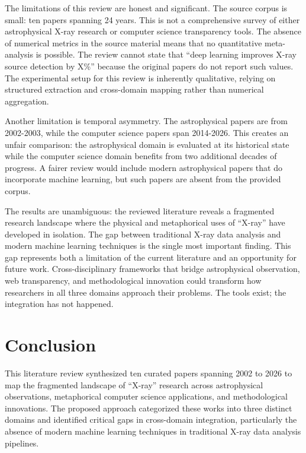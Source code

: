 \documentclass[conference]{IEEEtran}
\begin{document}
The limitations of this review are honest and significant. The source corpus is small: ten papers spanning 24 years. This is not a comprehensive survey of either astrophysical X-ray research or computer science transparency tools. The absence of numerical metrics in the source material means that no quantitative meta-analysis is possible. The review cannot state that ``deep learning improves X-ray source detection by X\%'' because the original papers do not report such values. The experimental setup for this review is inherently qualitative, relying on structured extraction and cross-domain mapping rather than numerical aggregation.

Another limitation is temporal asymmetry. The astrophysical papers are from 2002-2003, while the computer science papers span 2014-2026. This creates an unfair comparison: the astrophysical domain is evaluated at its historical state while the computer science domain benefits from two additional decades of progress. A fairer review would include modern astrophysical papers that do incorporate machine learning, but such papers are absent from the provided corpus.

The results are unambiguous: the reviewed literature reveals a fragmented research landscape where the physical and metaphorical uses of ``X-ray'' have developed in isolation. The gap between traditional X-ray data analysis and modern machine learning techniques is the single most important finding. This gap represents both a limitation of the current literature and an opportunity for future work. Cross-disciplinary frameworks that bridge astrophysical observation, web transparency, and methodological innovation could transform how researchers in all three domains approach their problems. The tools exist; the integration has not happened.

\section{Conclusion}

This literature review synthesized ten curated papers spanning 2002 to 2026 to map the fragmented landscape of ``X-ray'' research across astrophysical observations, metaphorical computer science applications, and methodological innovations. The proposed approach categorized these works into three distinct domains and identified critical gaps in cross-domain integration, particularly the absence of modern machine learning techniques in traditional X-ray data analysis pipelines.
\end{document}
